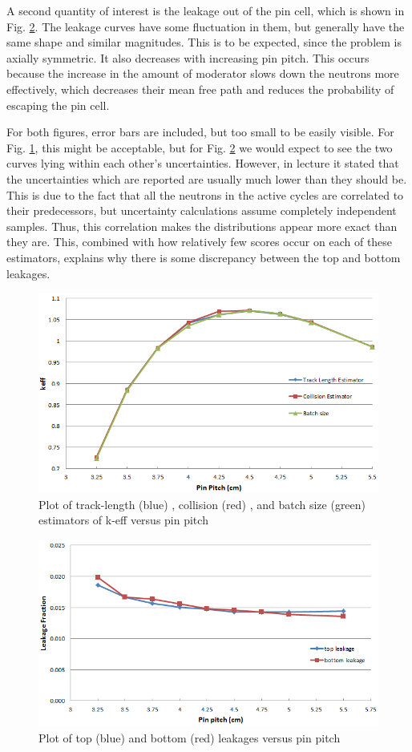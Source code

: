 A second quantity of interest is the leakage out of the pin cell, which is shown in Fig. \ref{f:leakVpitch}.  The leakage curves have some fluctuation in them, but generally have the same shape and similar magnitudes.  This is to be expected, since the problem is axially symmetric.  It also decreases with increasing pin pitch.  This occurs because the increase in the amount of moderator slows down the neutrons more effectively, which decreases their mean free path and reduces the probability of escaping the pin cell.

For both figures, error bars are included, but too small to be easily visible.  For Fig. \ref{f:keffVpitch}, this might be acceptable, but for Fig. \ref{f:leakVpitch} we would expect to see the two curves lying within each other's uncertainties.  However, in lecture it stated that the uncertainties which are reported are usually much lower than they should be.  This is due to the fact that all the neutrons in the active cycles are correlated to their predecessors, but uncertainty calculations assume completely independent samples.  Thus, this correlation makes the distributions appear more exact than they are.  This, combined with how relatively few scores occur on each of these estimators, explains why there is some discrepancy between the top and bottom leakages.

\begin{figure}[H]
\centering
\includegraphics[width=0.8\linewidth]{images/keff.png}
\caption{Plot of track-length (blue) ,  collision (red) , and batch size (green) estimators of k-eff versus pin pitch}
\label{f:keffVpitch}
\end{figure}

\begin{figure}[H]
\centering
\includegraphics[width=0.8\linewidth]{images/leakage.png}
\caption{Plot of top (blue) and bottom (red) leakages versus pin pitch}
\label{f:leakVpitch}
\end{figure}


